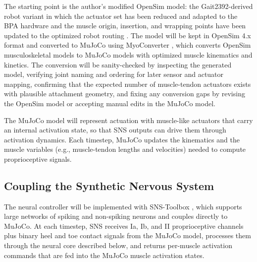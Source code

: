 The starting point is the author's modified OpenSim model: the Gait2392-derived robot variant in which the actuator set has been reduced and adapted to the BPA hardware and the muscle origin, insertion, and wrapping points have been updated to the optimized robot routing \citep{bolen_determination_2019, morrow_optimization_2020}. The model will be kept in OpenSim 4.x format and converted to MuJoCo \citep{todorov_mujoco_2012} using MyoConverter \citep{caggiano_myosuite_2022, wang_myosim_2022}, which converts OpenSim musculoskeletal models to MuJoCo models with optimized muscle kinematics and kinetics. The conversion will be sanity-checked by inspecting the generated model, verifying joint naming and ordering for later sensor and actuator mapping, confirming that the expected number of muscle-tendon actuators exists with plausible attachment geometry, and fixing any conversion gaps by revising the OpenSim model or accepting manual edits in the MuJoCo model.

The MuJoCo model will represent actuation with muscle-like actuators that carry an internal activation state, so that SNS outputs can drive them through activation dynamics. Each timestep, MuJoCo updates the kinematics and the muscle variables (e.g., muscle-tendon lengths and velocities) needed to compute proprioceptive signals.

\subsection{Coupling the Synthetic Nervous System}

The neural controller will be implemented with SNS-Toolbox \citep{nourse_sns_2023}, which supports large networks of spiking and non-spiking neurons and couples directly to MuJoCo. At each timestep, SNS receives Ia, Ib, and II proprioceptive channels plus binary heel and toe contact signals from the MuJoCo model, processes them through the neural core described below, and returns per-muscle activation commands that are fed into the MuJoCo muscle activation states.

